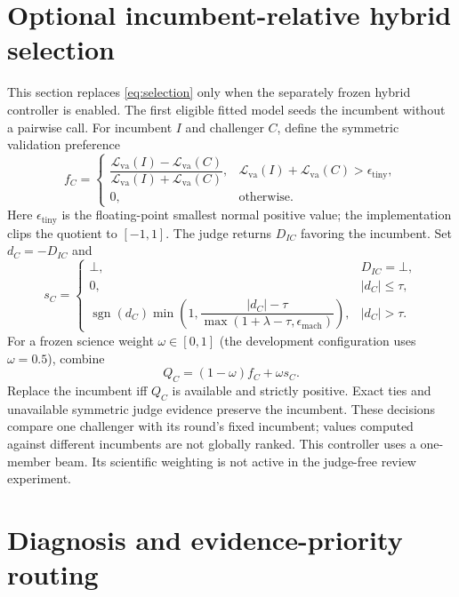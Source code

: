 \documentclass[11pt]{article}
\newcommand{\Loss}{\mathcal{L}}
\newcommand{\unknown}{\bot}
\DeclareMathOperator{\sgn}{sgn}
\begin{document}
\section{Optional incumbent-relative hybrid selection}
\label{sec:hybrid-selection}

This section replaces \eqref{eq:selection} only when the separately frozen hybrid
controller is enabled. The first eligible fitted model seeds the incumbent
without a pairwise call. For incumbent $I$ and challenger $C$, define the symmetric
validation preference
\begin{equation}
 f_C=\begin{cases}
 \dfrac{\Loss_{\mathrm{va}}(I)-\Loss_{\mathrm{va}}(C)}
 {\Loss_{\mathrm{va}}(I)+\Loss_{\mathrm{va}}(C)},
 &\Loss_{\mathrm{va}}(I)+\Loss_{\mathrm{va}}(C)>\epsilon_{\mathrm{tiny}},\\
 0,&\text{otherwise}.
 \end{cases}
\end{equation}
Here $\epsilon_{\mathrm{tiny}}$ is the floating-point smallest normal positive
value; the implementation clips the quotient to $[-1,1]$.
The judge returns $D_{IC}$ favoring the incumbent. Set $d_C=-D_{IC}$ and
\begin{equation}
 s_C=\begin{cases}
 \unknown,&D_{IC}=\unknown,\\
 0,&|d_C|\leq\tau,\\
 \sgn(d_C)\min\!\left(1,
 \dfrac{|d_C|-\tau}{\max(1+\lambda-\tau,\epsilon_{\mathrm{mach}})}\right),
 &|d_C|>\tau.
 \end{cases}
\end{equation}
For a frozen science weight $\omega\in[0,1]$ (the development configuration uses
$\omega=0.5$), combine
\begin{equation}
 Q_C=(1-\omega)f_C+\omega s_C.
\end{equation}
Replace the incumbent iff $Q_C$ is available and strictly positive. Exact ties
and unavailable symmetric judge evidence preserve the incumbent. These decisions
compare one challenger with its round's fixed incumbent; values computed against
different incumbents are not globally ranked. This controller uses a one-member
beam. Its scientific weighting is not active in the judge-free review experiment.

\section{Diagnosis and evidence-priority routing}
\label{sec:routing}
\end{document}
